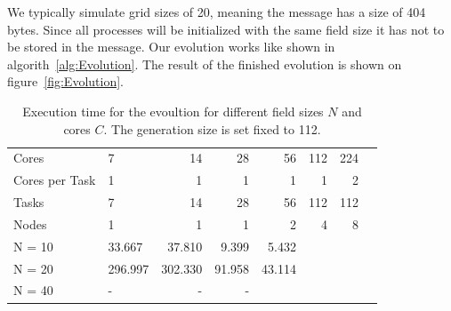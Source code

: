 \documentclass[12pt]{article}
\begin{document}
We typically simulate grid sizes of 20, meaning the message has a size of 404 bytes. Since all processes will be initialized with the same field size it has not to be stored in the message. Our evolution works like shown in algorith~\ref{alg:Evolution}. The result of the finished evolution is shown on figure~\ref{fig:Evolution}.


\begin{table}[t]
    \centering
    \begin{tabular}{llrrrrrr}
        \toprule
        Cores & 7 & 14 & 28 & 56 & 112 & 224 \\
        Cores per Task & 1 & 1 & 1 & 1 & 1 & 2 \\
        Tasks & 7 & 14 & 28 & 56 & 112 & 112 \\
        Nodes & 1 & 1 & 1 & 2 & 4 & 8 \\
        \midrule
        N = 10 & 33.667     & 37.810 & 9.399 & 5.432 \\
        N = 20 & 296.997    & 302.330 & 91.958 & 43.114 \\
        N = 40 & -          & - & - \\
        \bottomrule
    \end{tabular}
    \caption{Execution time for the evoultion for different field sizes $N$ and cores $C$. The generation size is set fixed to 112.}
    \label{tab:Speedup}
\end{table}
\end{document}
